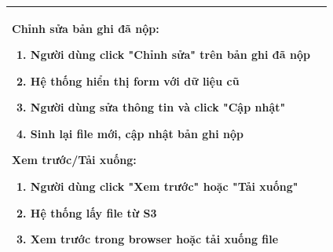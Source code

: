 \begin{table}[H]
\begin{tabular}{|m{}|m{}|}
    \textbf{Chỉnh sửa bản ghi đã nộp:}
    \begin{enumerate}
        \item Người dùng click "Chỉnh sửa" trên bản ghi đã nộp
        \item Hệ thống hiển thị form với dữ liệu cũ
        \item Người dùng sửa thông tin và click "Cập nhật"
        \item Sinh lại file mới, cập nhật bản ghi nộp
    \end{enumerate}

    \textbf{Xem trước/Tải xuống:}
    \begin{enumerate}
        \item Người dùng click "Xem trước" hoặc "Tải xuống"
        \item Hệ thống lấy file từ S3
        \item Xem trước trong browser hoặc tải xuống file
    \end{enumerate}
    \\ \hline
    \end{tabular}
    \end{table}


